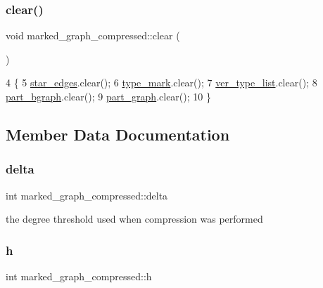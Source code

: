 \subsubsection{\texorpdfstring{clear()}{clear()}}
{\footnotesize\ttfamily void marked\+\_\+graph\+\_\+compressed\+::clear (\begin{DoxyParamCaption}{ }\end{DoxyParamCaption})}


\begin{DoxyCode}
4 \{
5   \hyperlink{classmarked__graph__compressed_a7df5779d313486644132bd816937f532}{star\_edges}.clear();
6   \hyperlink{classmarked__graph__compressed_a86b00223525703e973415cbc9c94da68}{type\_mark}.clear();
7   \hyperlink{classmarked__graph__compressed_af2e3e55223d436628a02758dfae88493}{ver\_type\_list}.clear();
8   \hyperlink{classmarked__graph__compressed_a7b3267063fba30b45eb21b3ba4e07536}{part\_bgraph}.clear();
9   \hyperlink{classmarked__graph__compressed_ae179a4737e6eab905c18a94d44ef64b7}{part\_graph}.clear();
10 \}
\end{DoxyCode}


\subsection{Member Data Documentation}
\mbox{\label{classmarked__graph__compressed_a8b2aaac68e9332ddc78d88eb60b323a7}} 
\subsubsection{\texorpdfstring{delta}{delta}}
{\footnotesize\ttfamily int marked\+\_\+graph\+\_\+compressed\+::delta}



the degree threshold used when compression was performed 

\mbox{\label{classmarked__graph__compressed_af6ff623407b673d08d0cab77b39c2193}} 
\subsubsection{\texorpdfstring{h}{h}}
{\footnotesize\ttfamily int marked\+\_\+graph\+\_\+compressed\+::h}




